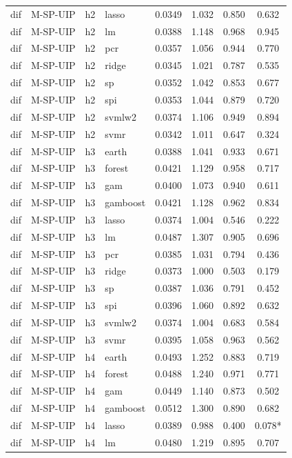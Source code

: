 \begin{ThreePartTable}
\begin{longtable}[t]{llclcccc}
dif & M-SP-UIP & h2 & lasso & 0.0349 & 1.032 & 0.850 & 0.632\\
dif & M-SP-UIP & h2 & lm & 0.0388 & 1.148 & 0.968 & 0.945\\
dif & M-SP-UIP & h2 & pcr & 0.0357 & 1.056 & 0.944 & 0.770\\
dif & M-SP-UIP & h2 & ridge & 0.0345 & 1.021 & 0.787 & 0.535\\
dif & M-SP-UIP & h2 & sp & 0.0352 & 1.042 & 0.853 & 0.677\\
dif & M-SP-UIP & h2 & spi & 0.0353 & 1.044 & 0.879 & 0.720\\
dif & M-SP-UIP & h2 & svmlw2 & 0.0374 & 1.106 & 0.949 & 0.894\\
dif & M-SP-UIP & h2 & svmr & 0.0342 & 1.011 & 0.647 & 0.324\\
\addlinespace
dif & M-SP-UIP & h3 & earth & 0.0388 & 1.041 & 0.933 & 0.671\\
dif & M-SP-UIP & h3 & forest & 0.0421 & 1.129 & 0.958 & 0.717\\
dif & M-SP-UIP & h3 & gam & 0.0400 & 1.073 & 0.940 & 0.611\\
dif & M-SP-UIP & h3 & gamboost & 0.0421 & 1.128 & 0.962 & 0.834\\
dif & M-SP-UIP & h3 & lasso & 0.0374 & 1.004 & 0.546 & 0.222\\
dif & M-SP-UIP & h3 & lm & 0.0487 & 1.307 & 0.905 & 0.696\\
dif & M-SP-UIP & h3 & pcr & 0.0385 & 1.031 & 0.794 & 0.436\\
dif & M-SP-UIP & h3 & ridge & 0.0373 & 1.000 & 0.503 & 0.179\\
dif & M-SP-UIP & h3 & sp & 0.0387 & 1.036 & 0.791 & 0.452\\
dif & M-SP-UIP & h3 & spi & 0.0396 & 1.060 & 0.892 & 0.632\\
dif & M-SP-UIP & h3 & svmlw2 & 0.0374 & 1.004 & 0.683 & 0.584\\
dif & M-SP-UIP & h3 & svmr & 0.0395 & 1.058 & 0.963 & 0.562\\
\addlinespace
dif & M-SP-UIP & h4 & earth & 0.0493 & 1.252 & 0.883 & 0.719\\
dif & M-SP-UIP & h4 & forest & 0.0488 & 1.240 & 0.971 & 0.771\\
dif & M-SP-UIP & h4 & gam & 0.0449 & 1.140 & 0.873 & 0.502\\
dif & M-SP-UIP & h4 & gamboost & 0.0512 & 1.300 & 0.890 & 0.682\\
dif & M-SP-UIP & h4 & lasso & 0.0389 & 0.988 & 0.400 & 0.078*\\
dif & M-SP-UIP & h4 & lm & 0.0480 & 1.219 & 0.895 & 0.707\\

\end{longtable}
\end{ThreePartTable}
